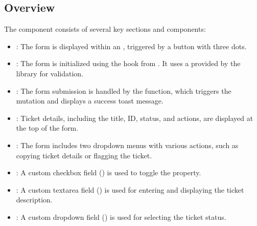 \documentclass[letterpaper,10pt,english]{sphinxmanual}
\begin{document}
\subsection{Overview}
\label{\detokenize{forms/tutor:overview}}
\sphinxAtStartPar
The  component consists of several key sections and components:
\begin{itemize}
\item {} 
\sphinxAtStartPar
{}: The form is displayed within an , triggered by a button with three dots.

\item {} 
\sphinxAtStartPar
{}: The form is initialized using the  hook from . It uses a  provided by the  library for validation.

\item {} 
\sphinxAtStartPar
{}: The form submission is handled by the  function, which triggers the  mutation and displays a success toast message.

\item {} 
\sphinxAtStartPar
{}: Ticket details, including the title, ID, status, and actions, are displayed at the top of the form.

\item {} 
\sphinxAtStartPar
{}: The form includes two dropdown menus with various actions, such as copying ticket details or flagging the ticket.

\item {} 
\sphinxAtStartPar
{}: A custom checkbox field () is used to toggle the  property.

\item {} 
\sphinxAtStartPar
{}: A custom textarea field () is used for entering and displaying the ticket description.

\item {} 
\sphinxAtStartPar
{}: A custom dropdown field () is used for selecting the ticket status.


\end{itemize}
\end{document}
